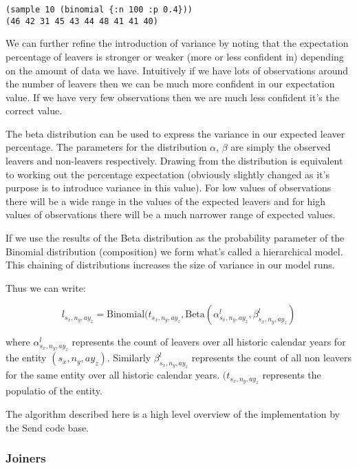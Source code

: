 \documentclass[margin=5mm]{article}
\begin{document}
\begin{lstlisting}
(sample 10 (binomial {:n 100 :p 0.4}))
(46 42 31 45 43 44 48 41 41 40)
\end{lstlisting}

We can further refine the introduction of variance by noting that the
expectation percentage of leavers is stronger or weaker (more or less
confident in) depending on the amount of data we have.  Intuitively if
we have lots of observations around the number of leavers then we can
be much more confident in our expectation value.  If we have very few
observations then we are much less confident it's the correct value.

The beta distribution can be used to express the variance in our
expected leaver percentage.  The parameters for the distribution
$\alpha$, $\beta$ are simply the observed leavers and non-leavers
respectively.  Drawing from the distribution is equivalent to working
out the percentage expectation (obviously slightly changed as it's
purpose is to introduce variance in this value).  For low values of
observations there will be a wide range in the values of the expected
leavers and for high values of observations there will be a much
narrower range of expected values.

If we use the results of the Beta distribution as the probability
parameter of the Binomial distribution (composition) we form what's
called a hierarchical model.  This chaining of distributions increases
the size of variance in our model runs.

Thus we can write:

\begin{equation*}
l_{s_x,n_y,ay_z} = \text{Binomial}(t_{s_x,n_y,ay_z},
\text{Beta}(\alpha^l_{s_x,n_y,ay_z}, \beta^l_{s_x,n_y,ay_z})
\end{equation*}

where $\alpha^l_{s_x,n_y,ay_z}$ represents the count of leavers over
all historic calendar years for the entity $({s_x,n_y,ay_z})$.
Similarly $\beta^l_{s_x,n_y,ay_z}$ represents the count of all non
leavers for the same entity over all historic calendar years.
$(t_{s_x,n_y,ay_z}$ represents the populatio of the entity.

The algorithm described here is a high level overview of the
implementation by the Send code base.

\subsubsection{Joiners}
\end{document}
